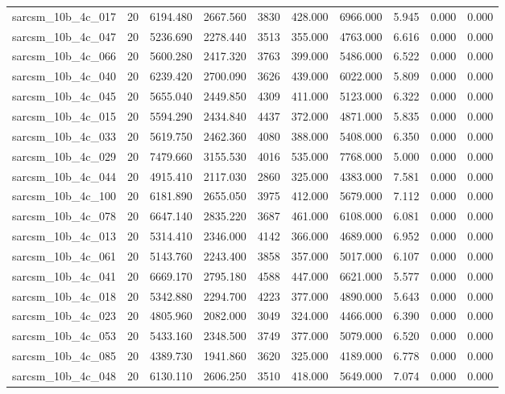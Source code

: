 \begin{tabular}{lrrrrrrrrr}
sarcsm\_10b\_4c\_017 & 20 & 6194.480 & 2667.560 & 3830 & 428.000 & 6966.000 & 5.945 & 0.000 & 0.000 \\
sarcsm\_10b\_4c\_047 & 20 & 5236.690 & 2278.440 & 3513 & 355.000 & 4763.000 & 6.616 & 0.000 & 0.000 \\
sarcsm\_10b\_4c\_066 & 20 & 5600.280 & 2417.320 & 3763 & 399.000 & 5486.000 & 6.522 & 0.000 & 0.000 \\
sarcsm\_10b\_4c\_040 & 20 & 6239.420 & 2700.090 & 3626 & 439.000 & 6022.000 & 5.809 & 0.000 & 0.000 \\
sarcsm\_10b\_4c\_045 & 20 & 5655.040 & 2449.850 & 4309 & 411.000 & 5123.000 & 6.322 & 0.000 & 0.000 \\
sarcsm\_10b\_4c\_015 & 20 & 5594.290 & 2434.840 & 4437 & 372.000 & 4871.000 & 5.835 & 0.000 & 0.000 \\
sarcsm\_10b\_4c\_033 & 20 & 5619.750 & 2462.360 & 4080 & 388.000 & 5408.000 & 6.350 & 0.000 & 0.000 \\
sarcsm\_10b\_4c\_029 & 20 & 7479.660 & 3155.530 & 4016 & 535.000 & 7768.000 & 5.000 & 0.000 & 0.000 \\
sarcsm\_10b\_4c\_044 & 20 & 4915.410 & 2117.030 & 2860 & 325.000 & 4383.000 & 7.581 & 0.000 & 0.000 \\
sarcsm\_10b\_4c\_100 & 20 & 6181.890 & 2655.050 & 3975 & 412.000 & 5679.000 & 7.112 & 0.000 & 0.000 \\
sarcsm\_10b\_4c\_078 & 20 & 6647.140 & 2835.220 & 3687 & 461.000 & 6108.000 & 6.081 & 0.000 & 0.000 \\
sarcsm\_10b\_4c\_013 & 20 & 5314.410 & 2346.000 & 4142 & 366.000 & 4689.000 & 6.952 & 0.000 & 0.000 \\
sarcsm\_10b\_4c\_061 & 20 & 5143.760 & 2243.400 & 3858 & 357.000 & 5017.000 & 6.107 & 0.000 & 0.000 \\
sarcsm\_10b\_4c\_041 & 20 & 6669.170 & 2795.180 & 4588 & 447.000 & 6621.000 & 5.577 & 0.000 & 0.000 \\
sarcsm\_10b\_4c\_018 & 20 & 5342.880 & 2294.700 & 4223 & 377.000 & 4890.000 & 5.643 & 0.000 & 0.000 \\
sarcsm\_10b\_4c\_023 & 20 & 4805.960 & 2082.000 & 3049 & 324.000 & 4466.000 & 6.390 & 0.000 & 0.000 \\
sarcsm\_10b\_4c\_053 & 20 & 5433.160 & 2348.500 & 3749 & 377.000 & 5079.000 & 6.520 & 0.000 & 0.000 \\
sarcsm\_10b\_4c\_085 & 20 & 4389.730 & 1941.860 & 3620 & 325.000 & 4189.000 & 6.778 & 0.000 & 0.000 \\
sarcsm\_10b\_4c\_048 & 20 & 6130.110 & 2606.250 & 3510 & 418.000 & 5649.000 & 7.074 & 0.000 & 0.000 \\

\end{tabular}
